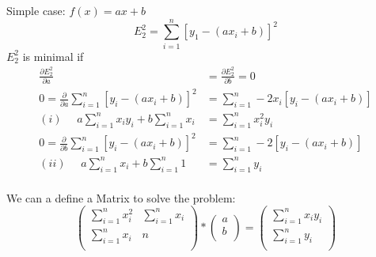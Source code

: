 \begin{example}
    Simple case: $f(x) = ax + b$
    \begin{equation*}
        E_2^2 = \sum_{i=1}^{n}[y_1 - (ax_i + b)]^2
    \end{equation*}
    $E_2^2$ is minimal if
    \begin{align*}
        \frac{\partial E_2^2}{\partial a} &= \frac{\partial E_2^2}{\partial b} = 0\\
        0 = \frac{\partial }{\partial a} \sum_{i=1}^n [y_i - (ax_i + b)]^2 &= \sum_{i=1}^n -2x_i[y_i - (ax_i + b)] \\
        (i) \phantom{=} a \sum_{i=1}^n x_i y_i + b \sum_{i=1}^n x_i &= \sum_{i=1}^n x_i^2 y_i \\
        0 = \frac{\partial }{\partial b} \sum_{i=1}^{n} [y_i - (ax_i + b)]^2 &= \sum_{i=1}^n -2[y_i - (ax_i + b)] \\
        (ii) \phantom{=} a \sum_{i=1}^n x_i + b \sum_{i=1}^n 1 &= \sum_{i=1}^n y_i \\
    \end{align*}

    We can a define a Matrix to solve the problem:
    \begin{equation*}
        \begin{pmatrix}
            \sum_{i=1}^n x_i^2 & \sum_{i=1}^n x_i \\
            \sum_{i=1}^n x_i   & n   \\
        \end{pmatrix}
        *
        \begin{pmatrix}
            a \\
            b \\
        \end{pmatrix}
        = 
        \begin{pmatrix}
            \sum_{i=1}^n x_i y_i \\
            \sum_{i=1}^n y_i \\
        \end{pmatrix}
    \end{equation*}
\end{example}




